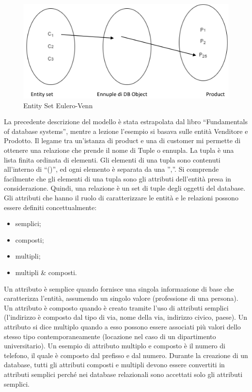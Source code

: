 \begin{center}
\begin{figure}[H]
\centering
\includegraphics[scale=1]{figures/entity_setEV.png}
\caption{Entity Set Eulero-Venn} 
\end{figure}
\end{center}

La precedente descrizione del modello è stata estrapolata dal libro “Fundamentals of database systems”, mentre a lezione l’esempio si basava sulle entità Venditore e Prodotto. Il legame tra un’istanza di product e una di customer mi permette di ottenere una relazione che prende il nome di Tuple o ennupla. La tupla è una lista finita ordinata di elementi. Gli elementi di una tupla sono contenuti all’interno di “()”, ed ogni elemento 
è separata da una ”,”. Si comprende facilmente che gli elementi di una tupla sono gli attributi dell’entità presa in considerazione. Quindi, una relazione è un set di tuple degli oggetti del database. 
Gli attributi che hanno il ruolo di caratterizzare le entità e le relazioni possono essere definiti concettualmente:

\begin{itemize}

\item semplici;
\item composti;
\item multipli;
\item multipli \& composti.

\end{itemize}

Un attributo è semplice quando fornisce una singola informazione di base che caratterizza l’entità, assumendo un singolo valore (professione di una persona). Un attributo è composto quando è creato tramite l’uso di attributi semplici (l’indirizzo è composto dal tipo di via, nome della via, indirizzo civico, paese). Un attributo si dice multiplo quando a esso possono essere associati più valori dello stesso tipo contemporaneamente (locazione nel caso di un dipartimento universitario). Un esempio di attributo multiplo e composto è il numero di telefono, il quale è composto dal prefisso e dal numero. Durante la creazione di un database, tutti gli attributi composti e multipli devono essere convertiti in attributi semplici perché nei database relazionali sono accettati solo gli attributi semplici. 


